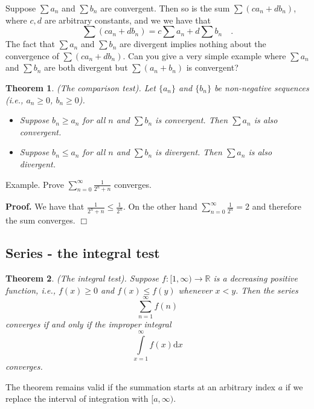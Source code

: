 \documentclass[12pt]{book}
\newcommand{\diff}{\text{d}}
\newenvironment{proof}[1][]{ \textbf{Proof#1.} }{$\Box$\medskip}
\newtheorem{theorem}{Theorem}[section]
\begin{document}
Suppose $\sum a_n$ and $\sum b_n$ are convergent. Then so is the sum $\sum (ca_n + db_n)$, where $c, d$ are arbitrary constants, and we we have that
\begin{equation}\label{eqLinearCombinationConvergentSeriesIsConvergent}
\sum (ca_n+db_n) = c\sum a_n +d\sum b_n\quad . 
\end{equation}
The fact that $\sum a_n$ and $\sum b_n$ are divergent implies nothing about the convergence of $\sum (ca_n+db_n) $. Can you give a very simple example where $\sum a_n$ and $\sum b_n$  are both divergent but $ \sum (a_n+b_n)$ is convergent?

\begin{theorem}\label{thSeriesComparisonTest} (The comparison test). Let $\{a_n\}$ and $\{b_n\}$ be non-negative sequences (i.e., $a_n\geq 0$, $b_n\geq 0$).
\begin{itemize}
\item Suppose $b_n\geq a_n$ for all $n$ and $\sum b_n$ is convergent. Then $\sum a_n$ is also convergent.
\item Suppose  $b_n\leq a_n$ for all $n$ and $\sum b_n$ is divergent. Then $\sum a_n$ is also divergent.
\end{itemize} 
\end{theorem}

Example. Prove $\sum_{n=0}^{\infty}\frac{1}{2^n+n}$ converges. 

\begin{proof}
We have that $\frac{1}{2^n+n}\leq\frac{1}{2^n}$. On the other hand $\sum_{n= 0}^{\infty} \frac{1}{2^n}=2$ and therefore the sum converges.
\end{proof}


\subsection{Series - the integral test}
\begin{theorem} \label{thIntegralConvergenceTest} (The integral test). Suppose $f:[1, \infty)\to \mathbb R$ is a decreasing positive function, i.e., $f(x)\geq 0$ and $f(x)\leq f(y)$ whenever $x<y$. Then the series 
\[
\sum_{n=1}^{\infty} f(n) 
\]
converges if and only if the improper integral
\[
\int\limits_{x=1}^{\infty}f(x)\diff x
\]
converges. 
\end{theorem}
The theorem remains valid if the summation starts at an arbitrary index $a$ if we replace the interval of integration with $[a, \infty)$.
\end{document}
